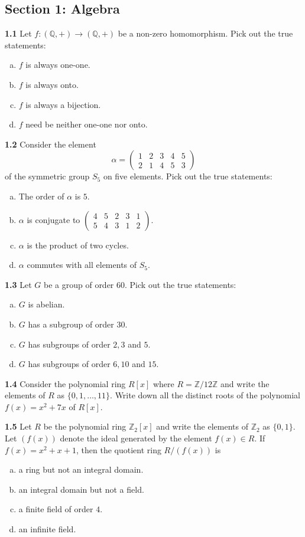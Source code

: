 \documentclass[11pt,a4paper]{article}
\newcommand{\Z}{\mathbb{Z}}
\newcommand{\Q}{\mathbb{Q}}
\newcommand{\examsec}[1]{%
  \subsection*{#1}
  \vspace{-2pt}
}
\newcommand{\qitem}[1]{\par\medskip\noindent\textbf{#1}\hspace{0.5em}}
\begin{document}
\examsec{Section 1: Algebra}

\qitem{1.1} Let $f : (\Q, +) \to (\Q, +)$ be a non-zero homomorphism. Pick out the true statements:
\begin{enumerate}[a.]
  \item $f$ is always one-one.
  \item $f$ is always onto.
  \item $f$ is always a bijection.
  \item $f$ need be neither one-one nor onto.
\end{enumerate}

\qitem{1.2} Consider the element
\[
  \alpha = \begin{pmatrix} 1 & 2 & 3 & 4 & 5 \\ 2 & 1 & 4 & 5 & 3 \end{pmatrix}
\]
of the symmetric group $S_5$ on five elements. Pick out the true statements:
\begin{enumerate}[a.]
  \item The order of $\alpha$ is $5$.
  \item $\alpha$ is conjugate to $\begin{pmatrix} 4 & 5 & 2 & 3 & 1 \\ 5 & 4 & 3 & 1 & 2 \end{pmatrix}$.
  \item $\alpha$ is the product of two cycles.
  \item $\alpha$ commutes with all elements of $S_5$.
\end{enumerate}

\qitem{1.3} Let $G$ be a group of order $60$. Pick out the true statements:
\begin{enumerate}[a.]
  \item $G$ is abelian.
  \item $G$ has a subgroup of order $30$.
  \item $G$ has subgroups of order $2, 3$ and $5$.
  \item $G$ has subgroups of order $6, 10$ and $15$.
\end{enumerate}

\qitem{1.4} Consider the polynomial ring $R[x]$ where $R = \Z/12\Z$ and write the elements of $R$ as $\{0, 1, \dots, 11\}$. Write down all the distinct roots of the polynomial $f(x) = x^2 + 7x$ of $R[x]$.

\qitem{1.5} Let $R$ be the polynomial ring $\Z_2[x]$ and write the elements of $\Z_2$ as $\{0, 1\}$. Let $(f(x))$ denote the ideal generated by the element $f(x) \in R$. If $f(x) = x^2 + x + 1$, then the quotient ring $R/(f(x))$ is
\begin{enumerate}[a.]
  \item a ring but not an integral domain.
  \item an integral domain but not a field.
  \item a finite field of order $4$.
  \item an infinite field.
\end{enumerate}
\end{document}
